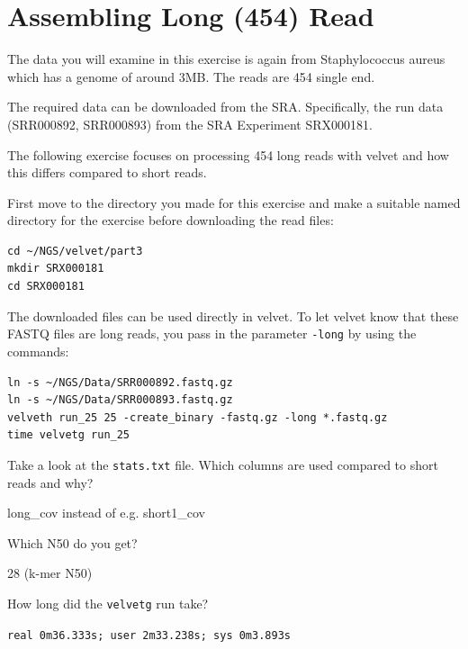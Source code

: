\section{Assembling Long (454) Read}

\begin{note}
The data you will examine in this exercise is again from Staphylococcus aureus
which has a genome of around 3MB. The reads are 454 single end.

The required data can be downloaded from the SRA. Specifically, the run data
(SRR000892, SRR000893) from the SRA Experiment SRX000181.

\end{note}

\begin{information}
The following exercise focuses on processing 454 long reads with velvet and how
this differs compared to short reads.
\end{information}

\begin{steps}
First move to the directory you made for this exercise and make a suitable named
directory for the exercise before downloading the read files:
\begin{lstlisting}
cd ~/NGS/velvet/part3
mkdir SRX000181
cd SRX000181
\end{lstlisting}

The downloaded files can be used directly in velvet. To let velvet know that
these FASTQ files are long reads, you pass in the parameter \texttt{-long} by
using the commands:
\begin{lstlisting}
ln -s ~/NGS/Data/SRR000892.fastq.gz
ln -s ~/NGS/Data/SRR000893.fastq.gz
velveth run_25 25 -create_binary -fastq.gz -long *.fastq.gz
time velvetg run_25
\end{lstlisting}
\end{steps}

\begin{questions}
Take a look at the \texttt{stats.txt} file. Which columns are used compared to
short reads and why?
\begin{answer}
long\_cov instead of e.g. short1\_cov
\end{answer}

Which N50 do you get?
\begin{answer}
28 (k-mer N50)
\end{answer}

How long did the \texttt{velvetg} run take?
\begin{answer}
\texttt{real    0m36.333s; user    2m33.238s; sys     0m3.893s}
\end{answer}
\end{questions}


